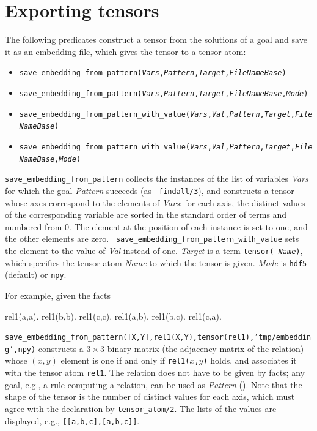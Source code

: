 \documentclass[a4paper]{report}
\begin{document}
\section{Exporting tensors}
\label{sec:save_embedding}

The following predicates construct a tensor from the solutions of a goal
and save it as an embedding file, which gives the tensor to a tensor atom:
\begin{itemize}
	\item {\tt save\_embedding\_from\_pattern({\it Vars},{\it Pattern},{\it Target},{\it FileNameBase})}
	\item {\tt save\_embedding\_from\_pattern({\it Vars},{\it Pattern},{\it Target},{\it FileNameBase},{\it Mode})}
	\item {\tt save\_embedding\_from\_pattern\_with\_value({\it Vars},{\it Val},{\it Pattern},{\it Target},{\it FileNameBase})}
	\item {\tt save\_embedding\_from\_pattern\_with\_value({\it Vars},{\it Val},{\it Pattern},{\it Target},{\it FileNameBase},{\it Mode})}
\end{itemize}
{\tt save\_embedding\_from\_pattern} collects the instances of the list of
variables {\it Vars} for which the goal {\it Pattern} succeeds (as {\tt
	findall/3}), and constructs a tensor whose axes correspond to the
elements of {\it Vars}: for each axis, the distinct values of the
corresponding variable are sorted in the standard order of terms and
numbered from 0.  The element at the position of each instance is set to
one, and the other elements are zero.  {\tt
	save\_embedding\_from\_pattern\_with\_value} sets the element to the value
of {\it Val} instead of one.  {\it Target} is a term {\tt tensor({\it
		Name})}, which specifies the tensor atom {\it Name} to which the tensor is
given.  {\it Mode} is {\tt hdf5} (default) or {\tt npy}.

For example, given the facts
\begin{prologcode}
rel1(a,a). rel1(b,b). rel1(c,c).
rel1(a,b). rel1(b,c). rel1(c,a).
\end{prologcode}
{\tt save\_embedding\_from\_pattern([X,Y],rel1(X,Y),tensor(rel1),'tmp/embedding',npy)}
constructs a $3\times 3$ binary matrix (the adjacency matrix of the
relation) whose $(x,y)$ element is one if and only if {\tt rel1($x$,$y$)}
holds, and associates it with the tensor atom {\tt rel1}.  The relation
does not have to be given by facts; any goal, e.g., a rule computing a
relation, can be used as {\it Pattern} ().
Note that the shape of the tensor is the number of distinct values for each
axis, which must agree with the declaration by {\tt tensor\_atom/2}.  The
lists of the values are displayed, e.g., {\tt [[a,b,c],[a,b,c]]}.
\end{document}

